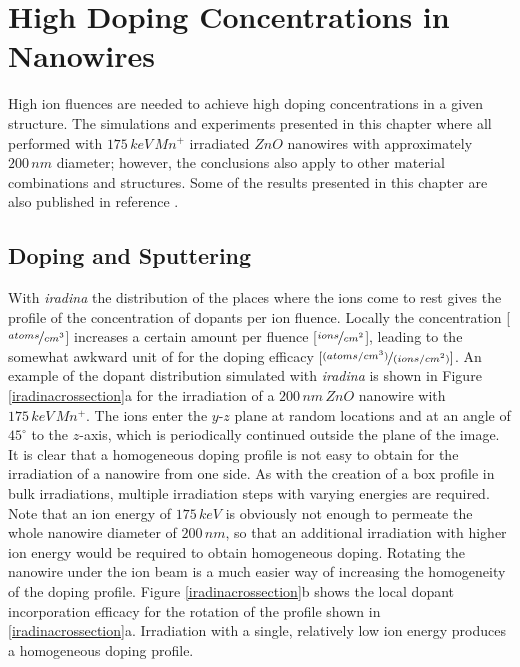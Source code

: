 \chapter{High Doping Concentrations in Nanowires}
\label{sec:high}

High ion fluences are needed to achieve high doping concentrations in a given structure. The simulations and experiments presented in this chapter where all performed with $175\, keV\,Mn^+$ irradiated $ZnO$ nanowires with approximately $200\,nm$ diameter; however, the conclusions also apply to other material combinations and structures. Some of the results presented in this chapter are also published in reference \cite{johannes_enhanced_2014}.

\section{Doping and Sputtering}

With \emph{iradina} the distribution of the places where the ions come to rest gives the profile of the concentration of dopants per ion fluence. Locally the concentration [$\nicefrac{atoms}{cm^{3}}$] increases a certain amount per fluence [$\nicefrac{ions}{cm^{2}}$], leading to the somewhat awkward unit of for the doping efficacy $[\nicefrac{(atoms/cm^{3})}{(ions/cm^{2})}]$. An example of the dopant distribution simulated with \emph{iradina} is shown in Figure \ref{iradinacrossection}a for the irradiation of a $200\,nm\,ZnO$ nanowire with $175\,keV\,Mn^+$. The ions enter the $y$-$z$ plane at random locations and at an angle of $45^\circ$ to the $z$-axis, which is periodically continued outside the plane of the image. It is clear that a homogeneous doping profile is not easy to obtain for the irradiation of a nanowire from one side. As with the creation of a box profile in bulk irradiations, multiple irradiation steps with varying energies are required. Note that an ion energy of $175\,keV$ is obviously not enough to permeate the whole nanowire diameter of $200\,nm$, so that an additional irradiation with higher ion energy would be required to obtain homogeneous doping. Rotating the nanowire under the ion beam is a much easier way of increasing the homogeneity of the doping profile. Figure \ref{iradinacrossection}b shows the local dopant incorporation efficacy for the rotation of the profile shown in \ref{iradinacrossection}a. Irradiation with a single, relatively low ion energy produces a homogeneous doping profile. 
  
